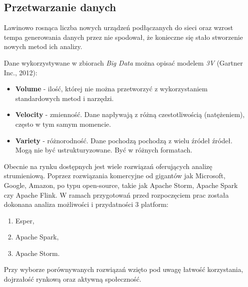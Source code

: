 \subsection{Przetwarzanie danych}

Lawinowo rosnąca liczba nowych urządzeń podłączanych do sieci
oraz wzrost tempa generowania danych przez nie spodował,
że konieczne się stało stworzenie nowych metod ich analizy.

Dane wykorzystywane w zbiorach \textit{Big Data} można opisać modelem \textit{3V} (Gartner Inc., 2012):
\begin{itemize}
		\item \textbf{Volume} - ilość,
		której nie można przetworzyć z wykorzystaniem standardowych metod i narzędzi.
		\item \textbf{Velocity} - zmienność.
		Dane napływają z różną czestotliwością (natężeniem),
		często w tym samym momencie.
		\item \textbf{Variety} - różnorodność.
		Dane pochodzą pochodzą z wielu źródeł źródeł.
		Mogą nie być ustrukturyzowane.
		Być w różnych formatach.
\end{itemize}


Obecnie na rynku dostępnych jest wiele rozwiązań oferujących analizę strumieniową.
Poprzez rozwiązania komercyjne od gigantów jak Microsoft, Google, Amazon,
po typu open-source,
takie jak Apache Storm, Apache Spark czy Apache Flink.
W ramach przygotowań przed rozpoczęciem prac została dokonana analiza
możliwości i przydatności 3 platform:
\begin{enumerate}
	\item Esper,
	\item Apache Spark,
	\item Apache Storm.
\end{enumerate}
Przy wyborze porównywanych rozwiązań wzięto pod uwagę
łatwość korzystania,
dojrzałość rynkową
oraz aktywną społeczność.


